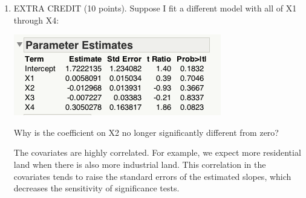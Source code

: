 \documentclass{article}\usepackage{graphicx, color}
\providecommand{\q}{$\quad$ \newline}
\numberwithin{equation}{section}
\begin{document}
\begin{flushleft}
\begin{enumerate}[1. ]
\item EXTRA CREDIT (10 points). Suppose I fit a different model with all of X1 through X4:

\begin{center}
 \includegraphics{../../fig/riversparams.png}
\end{center}

Why is the coefficient on X2 no longer significantly different from zero? \q


{\color{red}
The covariates are highly correlated. For example, we expect more residential land when there is also more industrial land. This correlation in the covariates tends to raise the standard errors of the estimated slopes, which decreases the sensitivity of significance tests.
}




\end{enumerate}
\end{flushleft}
\end{document}
